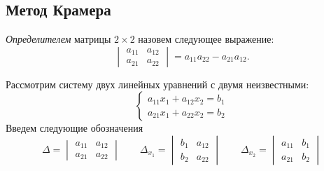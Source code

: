 \subsection*{Метод Крамера}

\emph{Определителем} матрицы $2 \times 2$ назовем следующее выражение:
\[
\begin{vmatrix}
    a_{11} & a_{12}
\\
    a_{21} & a_{22}
\end{vmatrix}
=
    a_{11} a_{22} - a_{21} a_{12}
.\]

Рассмотрим систему двух линейных уравнений с двумя неизвестными:
\[
\left\{\begin{aligned}
    a_{11} x_1 + a_{12} x_2 = b_1
\\
    a_{21} x_1 + a_{22} x_2 = b_2
\end{aligned}\right.
\]
Введем следующие обозначения
\[
    \Delta
=
\begin{vmatrix}
    a_{11} & a_{12}
\\
    a_{21} & a_{22}
\end{vmatrix}
\qquad
    \Delta_{x_1}
=
\begin{vmatrix}
    b_1 & a_{12}
\\
    b_2 & a_{22}
\end{vmatrix}
\qquad
    \Delta_{x_2}
=
\begin{vmatrix}
    a_{11} & b_1
\\
    a_{21} & b_2
\end{vmatrix}
\]

